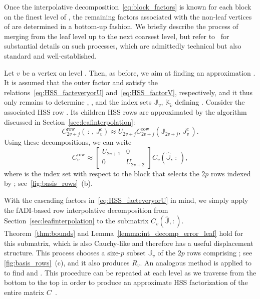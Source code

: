 \documentclass[final,reqno,onefignum,onetabnum]{siamart190516}
\begin{document}
Once the interpolative decomposition~\eqref{eq:block_factors} is known for each block on the finest level \smash{$\widehat{\ell}$} of , the remaining factors associated with the non-leaf vertices of  are determined
in a bottom-up fashion. We briefly describe the process of merging from the leaf level up to the next coarsest level, but refer to~\cite{wilber2021computing} for substantial details on such processes, which are admittedly technical but also standard and well-established.

Let $v$ be a vertex on level . Then, as before, we aim at finding an approximation . It is assumed that the outer factor   and  satisfy the relations~\eqref{eq:HSS_facteveryorU} and~\eqref{eq:HSS_factorV}, respectively, and it thus only remains to determine , , and the index sets $\mathbb J_v$, $\mathbb K_{\tilde{v}}$ defining .  Consider the associated HSS row . Its children HSS rows  are approximated by the algorithm discussed in Section~\ref{sec:leafinterpolation}:
$$C_{2v+j}^{\mathrm{row}}(\, : \, , \, J_v^c) \approx U_{2 v+j} C_{2v+j}^{\mathrm{row}}(\mathbb{J}_{2v+j}, \, J_v^c\,).$$ Using these decompositions, we can write
\begin{equation} 
\label{eq:non_leaf_row}
 C_v^{\mathrm{row}} \approx \begin{bmatrix} U_{2v+1} & 0 \\ 0 & U_{2v+2} \end{bmatrix} C_v(\widehat{\mathbb J}, \, : \,),
 \end{equation} 
where  is the index set with respect to the block  that selects the $2p$ rows indexed by ; see~\cref{fig:basis_rows}~(b).  

With the cascading factors in~\eqref{eq:HSS_facteveryorU} in mind, we simply apply the fADI-based row interpolative decomposition from Section~\ref{sec:leafinterpolation} to the submatrix $C_v(\widehat{\mathbb J},:)$.  Theorem~\ref{thm:bounds} and Lemma~\ref{lemma:int_decomp_error_leaf} hold for this submatrix, which is also Cauchy-like and therefore has a useful displacement structure. 
This process chooses a size-$p$ subset $\mathbb J_v$ of the $2 p$ rows comprising ; see \cref{fig:basis_rows}~(c), and it also produces $R_v$.  An analogous method is applied to  to find  and . This procedure can be repeated at each level as we traverse  from the bottom to the top in order to produce an approximate HSS factorization of the entire matrix $C$~\cite{martinsson2011fast}. 
\end{document}
